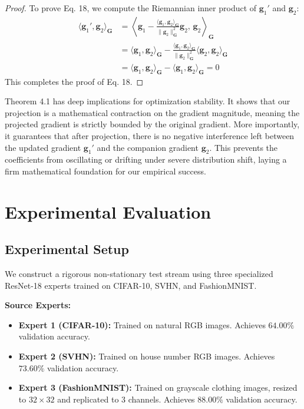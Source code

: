 \documentclass{article}
\theoremstyle{plain}
\theoremstyle{definition}
\theoremstyle{remark}
\begin{document}
\begin{proof}
To prove Eq. 18, we compute the Riemannian inner product of $\mathbf{g}_1'$ and $\mathbf{g}_2$:
\begin{align*}
    \langle \mathbf{g}_1', \mathbf{g}_2 \rangle_{\mathbf{G}} &= \left\langle \mathbf{g}_1 - \frac{\langle \mathbf{g}_1, \mathbf{g}_2 \rangle_{\mathbf{G}}}{\|\mathbf{g}_2\|_{\mathbf{G}}^2} \mathbf{g}_2, \, \mathbf{g}_2 \right\rangle_{\mathbf{G}} \\
    &= \langle \mathbf{g}_1, \mathbf{g}_2 \rangle_{\mathbf{G}} - \frac{\langle \mathbf{g}_1, \mathbf{g}_2 \rangle_{\mathbf{G}}}{\|\mathbf{g}_2\|_{\mathbf{G}}^2} \langle \mathbf{g}_2, \mathbf{g}_2 \rangle_{\mathbf{G}} \\
    &= \langle \mathbf{g}_1, \mathbf{g}_2 \rangle_{\mathbf{G}} - \langle \mathbf{g}_1, \mathbf{g}_2 \rangle_{\mathbf{G}} = 0
\end{align*}
This completes the proof of Eq. 18.
\end{proof}

Theorem 4.1 has deep implications for optimization stability. It shows that our projection is a mathematical contraction on the gradient magnitude, meaning the projected gradient is strictly bounded by the original gradient. More importantly, it guarantees that after projection, there is no negative interference left between the updated gradient $\mathbf{g}_1'$ and the companion gradient $\mathbf{g}_2$. This prevents the coefficients from oscillating or drifting under severe distribution shift, laying a firm mathematical foundation for our empirical success.

\section{Experimental Evaluation}
\label{submission-sec5}

\subsection{Experimental Setup}
We construct a rigorous non-stationary test stream using three specialized ResNet-18 experts trained on CIFAR-10, SVHN, and FashionMNIST.

\textbf{Source Experts:}
\begin{itemize}
    \item \textbf{Expert 1 (CIFAR-10):} Trained on natural RGB images. Achieves $64.00\%$ validation accuracy.
    \item \textbf{Expert 2 (SVHN):} Trained on house number RGB images. Achieves $73.60\%$ validation accuracy.
    \item \textbf{Expert 3 (FashionMNIST):} Trained on grayscale clothing images, resized to $32 \times 32$ and replicated to 3 channels. Achieves $88.00\%$ validation accuracy.
\end{itemize}
\end{document}
